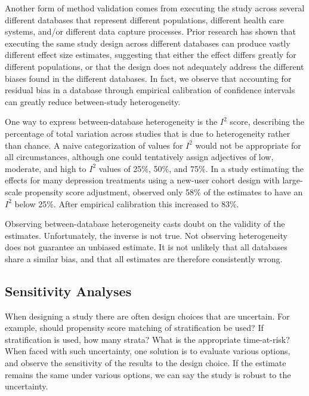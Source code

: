\documentclass[11pt]{book}
\theoremstyle{definition}
\theoremstyle{definition}
\theoremstyle{definition}
\theoremstyle{remark}
\let\BeginKnitrBlock\begin \let\EndKnitrBlock\end
\begin{document}

Another form of method validation comes from executing the study across
several different databases that represent different populations,
different health care systems, and/or different data capture processes.
Prior research has shown that executing the same study design across
different databases can produce vastly different effect size estimates,
\citep{madigan_2013} suggesting that either the effect differs greatly
for different populations, or that the design does not adequately
address the different biases found in the different databases. In fact,
we observe that accounting for residual bias in a database through
empirical calibration of confidence intervals can greatly reduce
between-study heterogeneity. \citep{schuemie_2018}

One way to express between-database heterogeneity is the \(I^2\) score,
describing the percentage of total variation across studies that is due
to heterogeneity rather than chance. \citep{higgins_2003} A naive
categorization of values for \(I^2\) would not be appropriate for all
circumstances, although one could tentatively assign adjectives of low,
moderate, and high to \(I^2\) values of 25\%, 50\%, and 75\%. In a study
estimating the effects for many depression treatments using a new-user
cohort design with large-scale propensity score adjustment,
\citep{schuemie_2018b} observed only 58\% of the estimates to have an
\(I^2\) below 25\%. After empirical calibration this increased to 83\%.

\BeginKnitrBlock{rmdimportant}
Observing between-database heterogeneity casts doubt on the validity of
the estimates. Unfortunately, the inverse is not true. Not observing
heterogeneity does not guarantee an unbiased estimate. It is not
unlikely that all databases share a similar bias, and that all estimates
are therefore consistently wrong.
\EndKnitrBlock{rmdimportant}

\subsection{Sensitivity Analyses}\label{sensitivity-analyses}


When designing a study there are often design choices that are
uncertain. For example, should propensity score matching of
stratification be used? If stratification is used, how many strata? What
is the appropriate time-at-risk? When faced with such uncertainty, one
solution is to evaluate various options, and observe the sensitivity of
the results to the design choice. If the estimate remains the same under
various options, we can say the study is robust to the uncertainty.
\end{document}
